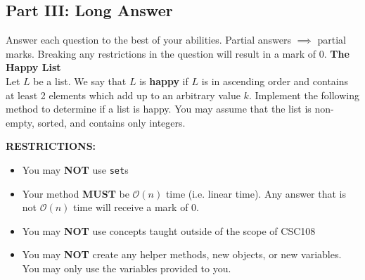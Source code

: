 \documentclass[letterpaper,13pt,addpoints]{exam}
\begin{document}
\begin{questions}

    \clearpage

    \section*{Part III: Long Answer}
    \setcounter{question}{0}
    Answer each question to the best of your abilities. Partial answers $\implies$ partial marks. Breaking any restrictions in the question will result in a mark of 0.
    \question[10] \textbf{The Happy List} \\
    Let $L$ be a list. We say that $L$ is \textbf{happy} if $L$ is in ascending order and contains at least 2 elements which add up to an arbitrary value $k$. Implement the following method to determine if a list is happy. You may assume that the list is non-empty, sorted, and contains only integers.

    \begin{center}

        \textbf{RESTRICTIONS:}
        \begin{itemize}
            \item You may \textbf{NOT} use \texttt{set}s
            \item Your method \textbf{MUST} be $\mathcal{O}(n)$ time (i.e. linear time). Any
                  answer that is not $\mathcal{O}(n)$ time will receive a mark of 0.
            \item You may \textbf{NOT} use concepts taught outside of the scope of CSC108
            \item You may \textbf{NOT} create any helper methods, new objects, or new variables.
                  You may only use the variables provided to you.
        \end{itemize}
    \end{center}


\end{questions}
\end{document}
